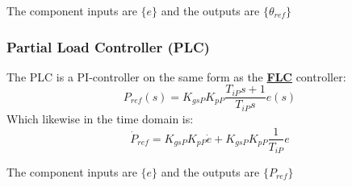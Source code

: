 The component inputs are $ \{e \} $ and the outputs are $ \{\theta_{ref} \} $


\subsubsection{Partial Load Controller (PLC)}
The PLC is a PI-controller on the same form as the \hyperref[sec:mod_wtLin_FLC]{\textbf{FLC}} controller:
\begin{equation}\label{eq:wtlin_comp_flc}
	P_{ref}(s) = K_{gs P} K_{p P} \dfrac{T_{i P} s + 1}{T_{i P} s} e(s)
\end{equation}
Which likewise in the time domain is:
\begin{equation}\label{key}
	\dot{P}_{ref} = K_{gs P} K_{p P} \dot{e} +  K_{gs P} K_{p P} \dfrac{1}{T_{i P}}e
\end{equation}

The component inputs are $ \{e \} $ and the outputs are $ \{P_{ref} \} $

%


